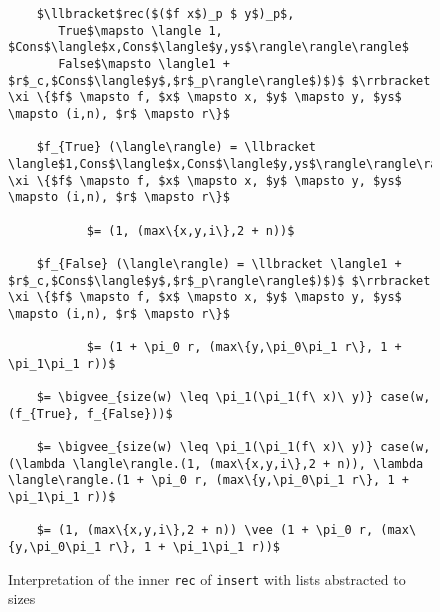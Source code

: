 \documentclass[12pt,letterpaper]{article}
\newcommand{\T}[1]{\texttt{#1}}
\begin{document}
\begin{figure}[H]
  \caption{Interpretation of the inner \T{rec} of \T{insert} with lists abstracted to sizes}
  \label{fig:interp_sizes_inner_rec}
  \begin{lstlisting}
    $\llbracket$rec($($f x$)_p $ y$)_p$,
       True$\mapsto \langle 1, $Cons$\langle$x,Cons$\langle$y,ys$\rangle\rangle\rangle$
       False$\mapsto \langle1 + $r$_c,$Cons$\langle$y$,$r$_p\rangle\rangle$)$)$ $\rrbracket \xi \{$f$ \mapsto f, $x$ \mapsto x, $y$ \mapsto y, $ys$ \mapsto (i,n), $r$ \mapsto r\}$

    $f_{True} (\langle\rangle) = \llbracket \langle$1,Cons$\langle$x,Cons$\langle$y,ys$\rangle\rangle\rangle\rrbracket \xi \{$f$ \mapsto f, $x$ \mapsto x, $y$ \mapsto y, $ys$ \mapsto (i,n), $r$ \mapsto r\}$

           $= (1, (max\{x,y,i\},2 + n))$

    $f_{False} (\langle\rangle) = \llbracket \langle1 + $r$_c,$Cons$\langle$y$,$r$_p\rangle\rangle$)$)$ $\rrbracket \xi \{$f$ \mapsto f, $x$ \mapsto x, $y$ \mapsto y, $ys$ \mapsto (i,n), $r$ \mapsto r\}$

           $= (1 + \pi_0 r, (max\{y,\pi_0\pi_1 r\}, 1 + \pi_1\pi_1 r))$
    
    $= \bigvee_{size(w) \leq \pi_1(\pi_1(f\ x)\ y)} case(w, (f_{True}, f_{False}))$

    $= \bigvee_{size(w) \leq \pi_1(\pi_1(f\ x)\ y)} case(w, (\lambda \langle\rangle.(1, (max\{x,y,i\},2 + n)), \lambda \langle\rangle.(1 + \pi_0 r, (max\{y,\pi_0\pi_1 r\}, 1 + \pi_1\pi_1 r))$

    $= (1, (max\{x,y,i\},2 + n)) \vee (1 + \pi_0 r, (max\{y,\pi_0\pi_1 r\}, 1 + \pi_1\pi_1 r))$
  \end{lstlisting}
\end{figure}
\end{document}
